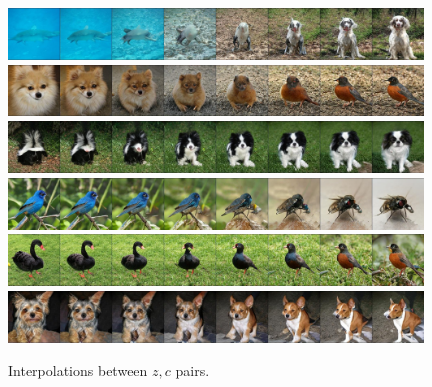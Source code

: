 \begin{figure}[htbp]
\centering
\includegraphics[width=0.98\textwidth]{images/interps0/256ZCInterp2.jpg} \\
\includegraphics[width=0.98\textwidth]{images/interps0/256ZCInterp4.jpg} \\
\includegraphics[width=0.98\textwidth]{images/interps0/256ZCInterp6.jpg} \\
\includegraphics[width=0.98\textwidth]{images/interps0/256ZCInterp9.jpg} \\
\includegraphics[width=0.98\textwidth]{images/interps0/256ZCInterp0.jpg}
\includegraphics[width=0.98\textwidth]{images/interps0/256ZCInterp8.jpg} 
\caption{Interpolations between $z,c$ pairs.}
\label{appendix_ZCinterp}
\end{figure}

